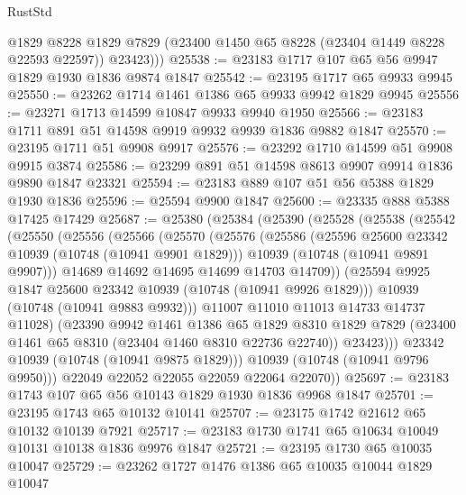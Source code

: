\begin{lexlean}{RustStd}
\begin{coremodule}
{\begin{coremodule}
{{{{{          @1829
          @8228
          @1829
          @7829
          (@23400 @1450 @65 @8228 (@23404 @1449 @8228 @22593 @22597))
          @23423)))
@25538 := @23183 @1717 @107 @65 @56 @9947 @1829 @1930 @1836 @9874 @1847
@25542 := @23195 @1717 @65 @9933 @9945
@25550 := @23262 @1714 @1461 @1386 @65 @9933 @9942 @1829 @9945
@25556 := @23271 @1713 @14599 @10847 @9933 @9940 @1950
@25566 := @23183 @1711 @891 @51 @14598 @9919 @9932 @9939 @1836 @9882 @1847
@25570 := @23195 @1711 @51 @9908 @9917
@25576 := @23292 @1710 @14599 @51 @9908 @9915 @3874
@25586 := @23299 @891 @51 @14598 @8613 @9907 @9914 @1836 @9890 @1847 @23321
@25594 := @23183 @889 @107 @51 @56 @5388 @1829 @1930 @1836
@25596 := @25594 @9900 @1847
@25600 := @23335 @888 @5388 @17425 @17429
@25687 := @25380
    (@25384
      (@25390
        (@25528
          (@25538
            (@25542
              (@25550
                (@25556
                  (@25566
                    (@25570
                      (@25576
                        (@25586
                          (@25596 @25600 @23342 @10939 (@10748 (@10941 @9901 @1829)))
                          @10939
                          (@10748 (@10941 @9891 @9907)))
                        @14689
                        @14692
                        @14695
                        @14699
                        @14703
                        @14709))
                    (@25594 @9925 @1847 @25600 @23342 @10939 (@10748 (@10941 @9926 @1829)))
                    @10939
                    (@10748 (@10941 @9883 @9932)))
                  @11007
                  @11010
                  @11013
                  @14733
                  @14737
                  @11028)
                (@23390
                  @9942
                  @1461
                  @1386
                  @65
                  @1829
                  @8310
                  @1829
                  @7829
                  (@23400 @1461 @65 @8310 (@23404 @1460 @8310 @22736 @22740))
                  @23423)))
            @23342
            @10939
            (@10748 (@10941 @9875 @1829)))
          @10939
          (@10748 (@10941 @9796 @9950)))
        @22049
        @22052
        @22055
        @22059
        @22064
        @22070))
@25697 := @23183 @1743 @107 @65 @56 @10143 @1829 @1930 @1836 @9968 @1847
@25701 := @23195 @1743 @65 @10132 @10141
@25707 := @23175 @1742 @21612 @65 @10132 @10139 @7921
@25717 := @23183 @1730 @1741 @65 @10634 @10049 @10131 @10138 @1836 @9976 @1847
@25721 := @23195 @1730 @65 @10035 @10047
@25729 := @23262 @1727 @1476 @1386 @65 @10035 @10044 @1829 @10047
}}}}}
\end{coremodule}}
\end{coremodule}
\end{lexlean}
